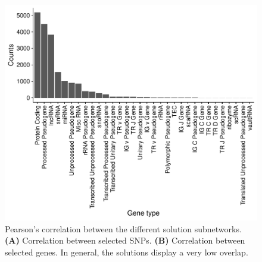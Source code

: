 \documentclass[twocolumn, 11pt, draft]{article}
\begin{document}
\begin{figure}[htbp]
\centering
\includegraphics[width=.9\linewidth]{./figures/sfigure_3.pdf}
\caption{\label{sfig:pearson_methods}
Pearson's correlation between the different solution subnetworks. \textbf{(A)} Correlation between selected SNPs. \textbf{(B)} Correlation between selected genes. In general, the solutions display a very low overlap.}
\end{figure}
\end{document}
